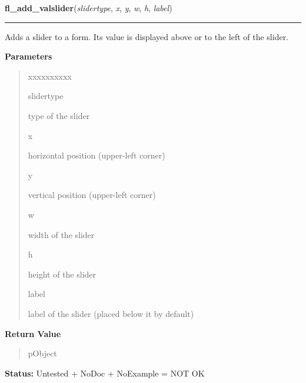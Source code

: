 \hspace{.8\funcindent}\begin{boxedminipage}{\funcwidth}

    \raggedright \textbf{fl\_add\_valslider}(\textit{slidertype}, \textit{x}, \textit{y}, \textit{w}, \textit{h}, \textit{label})

    \vspace{-1.5ex}

    \rule{\textwidth}{0.5\fboxrule}
\setlength{\parskip}{2ex}
    Adds a slider to a form. Its value is displayed above or to the left of
    the slider.

\setlength{\parskip}{1ex}
      \textbf{Parameters}
      \vspace{-1ex}

      \begin{quote}
        \begin{Ventry}{xxxxxxxxxx}

          \item[slidertype]

          type of the slider

          \item[x]

          horizontal position (upper-left corner)

          \item[y]

          vertical position (upper-left corner)

          \item[w]

          width of the slider

          \item[h]

          height of the slider

          \item[label]

          label of the slider (placed below it by default)

        \end{Ventry}

      \end{quote}

      \textbf{Return Value}
    \vspace{-1ex}

      \begin{quote}
      pObject

      \end{quote}

\textbf{Status:} Untested + NoDoc + NoExample = NOT OK



    \end{boxedminipage}

